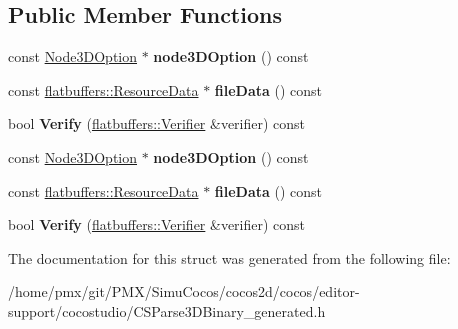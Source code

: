 \subsection*{Public Member Functions}
\begin{DoxyCompactItemize}
\item 
\mbox{\label{structflatbuffers_1_1Particle3DOptions_ab45370484f8e677272f9a10f4bdd11f2}} 
const \hyperlink{structflatbuffers_1_1Node3DOption}{Node3\+D\+Option} $\ast$ {\bfseries node3\+D\+Option} () const
\item 
\mbox{\label{structflatbuffers_1_1Particle3DOptions_a8c484aa398f63945c239d65584af1a9e}} 
const \hyperlink{structflatbuffers_1_1ResourceData}{flatbuffers\+::\+Resource\+Data} $\ast$ {\bfseries file\+Data} () const
\item 
\mbox{\label{structflatbuffers_1_1Particle3DOptions_ab9844c8bc07a3a0e545dab67ab29ecd8}} 
bool {\bfseries Verify} (\hyperlink{classflatbuffers_1_1Verifier}{flatbuffers\+::\+Verifier} \&verifier) const
\item 
\mbox{\label{structflatbuffers_1_1Particle3DOptions_ab45370484f8e677272f9a10f4bdd11f2}} 
const \hyperlink{structflatbuffers_1_1Node3DOption}{Node3\+D\+Option} $\ast$ {\bfseries node3\+D\+Option} () const
\item 
\mbox{\label{structflatbuffers_1_1Particle3DOptions_a8c484aa398f63945c239d65584af1a9e}} 
const \hyperlink{structflatbuffers_1_1ResourceData}{flatbuffers\+::\+Resource\+Data} $\ast$ {\bfseries file\+Data} () const
\item 
\mbox{\label{structflatbuffers_1_1Particle3DOptions_ab9844c8bc07a3a0e545dab67ab29ecd8}} 
bool {\bfseries Verify} (\hyperlink{classflatbuffers_1_1Verifier}{flatbuffers\+::\+Verifier} \&verifier) const
\end{DoxyCompactItemize}


The documentation for this struct was generated from the following file\+:\begin{DoxyCompactItemize}
\item 
/home/pmx/git/\+P\+M\+X/\+Simu\+Cocos/cocos2d/cocos/editor-\/support/cocostudio/C\+S\+Parse3\+D\+Binary\+\_\+generated.\+h\end{DoxyCompactItemize}
